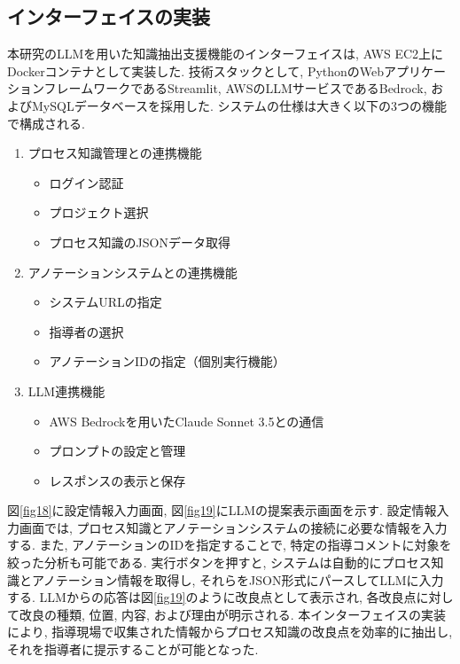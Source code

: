 \label{fig17}



\subsection{インターフェイスの実装}
本研究のLLMを用いた知識抽出支援機能のインターフェイスは, AWS EC2上にDockerコンテナとして実装した. 技術スタックとして, PythonのWebアプリケーションフレームワークであるStreamlit, AWSのLLMサービスであるBedrock, およびMySQLデータベースを採用した. 
システムの仕様は大きく以下の3つの機能で構成される.
\begin{enumerate}
\item プロセス知識管理との連携機能
\begin{itemize}
\item ログイン認証
\item プロジェクト選択
\item プロセス知識のJSONデータ取得
\end{itemize}
\item アノテーションシステムとの連携機能
    \begin{itemize}
        \item システムURLの指定
        \item 指導者の選択
        \item アノテーションIDの指定（個別実行機能）
    \end{itemize}
\item LLM連携機能
    \begin{itemize}
        \item AWS Bedrockを用いたClaude Sonnet 3.5との通信
        \item プロンプトの設定と管理
        \item レスポンスの表示と保存
    \end{itemize}
\end{enumerate}
図\ref{fig18}に設定情報入力画面, 図\ref{fig19}にLLMの提案表示画面を示す. 設定情報入力画面では, プロセス知識とアノテーションシステムの接続に必要な情報を入力する. また, アノテーションのIDを指定することで, 特定の指導コメントに対象を絞った分析も可能である. 実行ボタンを押すと, システムは自動的にプロセス知識とアノテーション情報を取得し, それらをJSON形式にパースしてLLMに入力する. LLMからの応答は図\ref{fig19}のように改良点として表示され, 各改良点に対して改良の種類, 位置, 内容, および理由が明示される. 
本インターフェイスの実装により, 指導現場で収集された情報からプロセス知識の改良点を効率的に抽出し, それを指導者に提示することが可能となった. 

